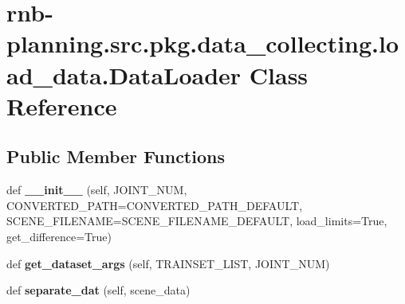 \hypertarget{classrnb-planning_1_1src_1_1pkg_1_1data__collecting_1_1load__data_1_1_data_loader}{}\section{rnb-\/planning.src.\+pkg.\+data\+\_\+collecting.\+load\+\_\+data.\+Data\+Loader Class Reference}
\label{classrnb-planning_1_1src_1_1pkg_1_1data__collecting_1_1load__data_1_1_data_loader}
\subsection*{Public Member Functions}
\begin{DoxyCompactItemize}
\item 
\mbox{\label{classrnb-planning_1_1src_1_1pkg_1_1data__collecting_1_1load__data_1_1_data_loader_a4d1ab9101e9c1dc4899ebd8184959b1c}} 
def {\bfseries \+\_\+\+\_\+init\+\_\+\+\_\+} (self, J\+O\+I\+N\+T\+\_\+\+N\+UM, C\+O\+N\+V\+E\+R\+T\+E\+D\+\_\+\+P\+A\+TH=C\+O\+N\+V\+E\+R\+T\+E\+D\+\_\+\+P\+A\+T\+H\+\_\+\+D\+E\+F\+A\+U\+LT, S\+C\+E\+N\+E\+\_\+\+F\+I\+L\+E\+N\+A\+ME=S\+C\+E\+N\+E\+\_\+\+F\+I\+L\+E\+N\+A\+M\+E\+\_\+\+D\+E\+F\+A\+U\+LT, load\+\_\+limits=True, get\+\_\+difference=True)
\item 
\mbox{\label{classrnb-planning_1_1src_1_1pkg_1_1data__collecting_1_1load__data_1_1_data_loader_a8a6a6050f39d8de867884dd38073fc70}} 
def {\bfseries get\+\_\+dataset\+\_\+args} (self, T\+R\+A\+I\+N\+S\+E\+T\+\_\+\+L\+I\+ST, J\+O\+I\+N\+T\+\_\+\+N\+UM)
\item 
\mbox{\label{classrnb-planning_1_1src_1_1pkg_1_1data__collecting_1_1load__data_1_1_data_loader_ab6ebe3cb60b7d309b236801a15c623ed}} 
def {\bfseries separate\+\_\+dat} (self, scene\+\_\+data)
\end{DoxyCompactItemize}
